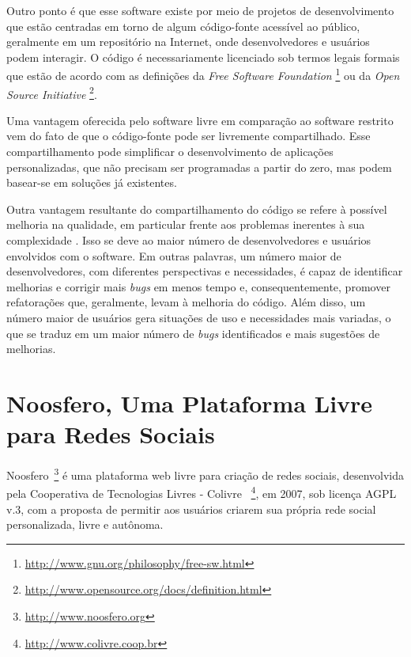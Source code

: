Outro ponto é que esse software existe por meio de projetos de desenvolvimento
que estão centradas em torno de algum código-fonte acessível ao público,
geralmente em um repositório na Internet, onde desenvolvedores e usuários
podem interagir.
%
O código é necessariamente licenciado sob termos legais formais que estão de
acordo com as definições da \textit{Free Software Foundation}
\footnote{\url{http://www.gnu.org/philosophy/free-sw.html}} ou da
\textit{Open Source Initiative}
\footnote{\url{http://www.opensource.org/docs/definition.html}}.


Uma vantagem oferecida pelo software livre em comparação ao software
restrito vem do fato de que o código-fonte pode ser livremente compartilhado.
%
Esse compartilhamento pode simplificar o desenvolvimento de aplicações
personalizadas, que não precisam ser programadas a partir do zero, mas
podem basear-se em soluções já existentes.

Outra vantagem resultante do compartilhamento do código se refere
à possível melhoria na qualidade, em particular frente aos
problemas inerentes à sua complexidade \cite{CatedralBazzar}.
%
Isso se deve ao maior número de desenvolvedores e usuários envolvidos
com o software. Em outras palavras, um número maior de desenvolvedores, com diferentes
perspectivas e necessidades, é capaz de identificar melhorias e corrigir
mais \emph{bugs} em menos tempo e, consequentemente, promover refatorações que,
geralmente, levam à melhoria do código.
%
Além disso, um número maior de usuários gera situações de uso e
necessidades mais variadas, o que se traduz em um maior número
de \emph{bugs} identificados e mais sugestões de melhorias.


\section{Noosfero, Uma Plataforma Livre para Redes Sociais}
\label{noosfero-section}

Noosfero~\footnote{\url{http://www.noosfero.org}}
é uma  plataforma web livre para criação de redes sociais, desenvolvida
pela Cooperativa de Tecnologias Livres - Colivre
~\footnote{\url{http://www.colivre.coop.br}},
em 2007, sob licença AGPL v.3, com a proposta de permitir aos usuários criarem sua
própria rede social personalizada, livre e autônoma.

